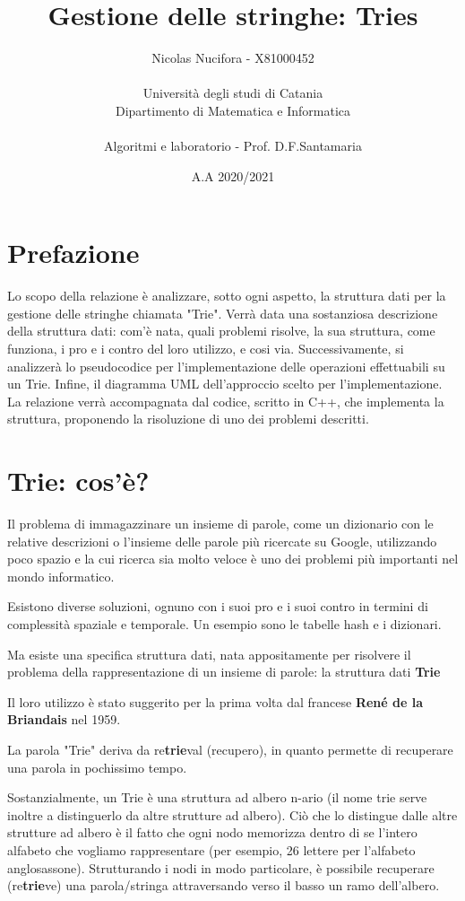 \documentclass[a4paper, 12pt]{article}
\title{Gestione delle stringhe: Tries}
\author{Nicolas Nucifora - X81000452\\\\Università degli studi di Catania\\ Dipartimento di Matematica e Informatica\\\\Algoritmi e laboratorio - Prof. D.F.Santamaria}
\date{A.A 2020/2021}
\begin{document}
\maketitle
\large
\flushleft
\clearpage

\tableofcontents

\clearpage

\section*{Prefazione}
Lo scopo della relazione è analizzare, sotto ogni aspetto, la struttura dati per la gestione delle stringhe chiamata "Trie". Verrà data una sostanziosa descrizione della struttura dati: com'è nata, quali problemi risolve, la sua struttura, come funziona, i pro e i contro del loro utilizzo, e cosi via. Successivamente, si analizzerà lo pseudocodice per l'implementazione delle operazioni effettuabili su un Trie. Infine, il diagramma UML dell'approccio scelto per l'implementazione.
La relazione verrà accompagnata dal codice, scritto in C++, che implementa la struttura, proponendo la risoluzione di uno dei problemi descritti.

\clearpage

\section{Trie: cos'è?}
Il problema di immagazzinare un insieme di parole, come un dizionario con le relative descrizioni o l'insieme delle parole più ricercate su Google, utilizzando poco spazio e la cui ricerca sia molto veloce è uno dei problemi più importanti nel mondo informatico.

Esistono diverse soluzioni, ognuno con i suoi pro e i suoi contro in termini di complessità spaziale e temporale. Un esempio sono le tabelle hash e i dizionari. 

Ma esiste una specifica struttura dati, nata appositamente per risolvere il problema della rappresentazione di un insieme di parole: la struttura dati \textbf{Trie}

Il loro utilizzo è stato suggerito per la prima volta dal francese \textbf{René de la Briandais} nel 1959.

La parola "Trie" deriva da re\textbf{trie}val (recupero), in quanto permette di recuperare una parola in pochissimo tempo. 
\vspace{5mm}

Sostanzialmente, un Trie è una struttura ad albero n-ario (il nome trie serve inoltre a distinguerlo da altre strutture ad albero). Ciò che lo distingue dalle altre strutture ad albero è il fatto che ogni nodo memorizza dentro di se l'intero alfabeto che vogliamo rappresentare (per esempio, 26 lettere per l'alfabeto anglosassone). Strutturando i nodi in modo particolare, è possibile recuperare (re\textbf{trie}ve) una parola/stringa attraversando verso il basso un ramo dell'albero.
\vspace{5mm}
\end{document}
